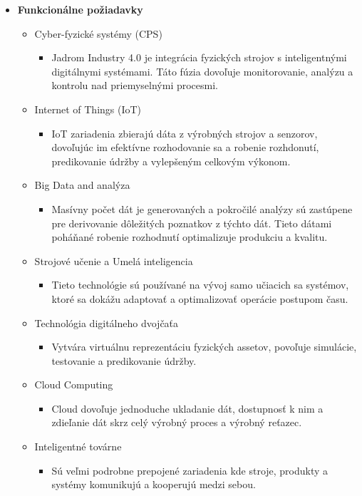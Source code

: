 \begin{itemize}
       \item \textbf{Funkcionálne požiadavky}
       
       \begin{itemize}
         \item Cyber-fyzické systémy (CPS)
            \begin{itemize}
                \item Jadrom Industry 4.0 je integrácia fyzických strojov s inteligentnými digitálnymi systémami. Táto fúzia dovoľuje monitorovanie, analýzu a kontrolu nad priemyselnými procesmi.
            \end{itemize}
         \item Internet of Things (IoT)
            \begin{itemize}
                \item IoT zariadenia zbierajú dáta z výrobných strojov a senzorov, dovoľujúc im efektívne rozhodovanie sa a robenie rozhdonutí, predikovanie údržby a vylepšeným celkovým výkonom.
            \end{itemize}
         \item Big Data and analýza
            \begin{itemize}
                \item Masívny počet dát je generovaných a pokročilé analýzy sú zastúpene pre derivovanie dôležitých poznatkov z týchto dát. Tieto dátami poháňané robenie rozhodnutí optimalizuje produkciu a kvalitu.
            \end{itemize}
         \item Strojové učenie a Umelá inteligencia
            \begin{itemize}
                \item Tieto technológie sú používané na vývoj samo učiacich sa systémov, ktoré sa dokážu adaptovať a optimalizovať operácie postupom času.
            \end{itemize}
         \item Technológia digitálneho dvojčaťa
            \begin{itemize}
                \item Vytvára virtuálnu reprezentáciu fyzických assetov, povoľuje simulácie, testovanie a predikovanie údržby.
            \end{itemize}
         \item Cloud Computing
            \begin{itemize}
                \item Cloud dovoľuje jednoduche ukladanie dát, dostupnosť k nim a zdieľanie dát skrz celý výrobný proces a výrobný reťazec.
            \end{itemize}
         \item Inteligentné továrne
            \begin{itemize}
                \item Sú veľmi podrobne prepojené zariadenia kde stroje, produkty a systémy komunikujú a kooperujú medzi sebou.
            \end{itemize}
       \end{itemize}
    \end{itemize}

